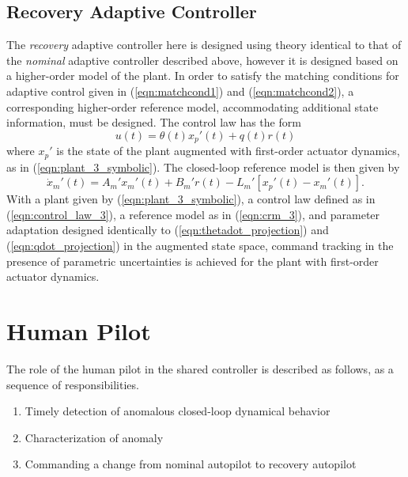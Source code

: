\subsection{Recovery Adaptive Controller} \label{subsec:siso_recovery_ac}
The \textit{recovery} adaptive controller here is designed using theory identical to that of the \textit{nominal} adaptive controller described above, however it is designed based on a higher-order model of the plant. In order to satisfy the matching conditions for adaptive control given in (\ref{eqn:matchcond1}) and (\ref{eqn:matchcond2}), a corresponding higher-order reference model, accommodating additional state information, must be designed. The control law has the form
\begin{equation}
	u(t) = \theta(t) x_p'(t) + q(t) r(t)
	\label{eqn:control_law_3}
\end{equation}
where $x_p'$ is the state of the plant augmented with first-order actuator dynamics, as in (\ref{eqn:plant_3_symbolic}). The closed-loop reference model is then given by
\begin{equation}
	\dot{x}_m'(t) = A_m' x_m'(t) + B_m' r(t) - L_m' \left[x_p'(t) - x_m'(t)\right].
	\label{eqn:crm_3}
\end{equation}
With a plant given by (\ref{eqn:plant_3_symbolic}), a control law defined as in (\ref{eqn:control_law_3}), a reference model as in (\ref{eqn:crm_3}), and parameter adaptation designed identically to (\ref{eqn:thetadot_projection}) and (\ref{eqn:qdot_projection}) in the augmented state space, command tracking in the presence of parametric uncertainties is achieved for the plant with first-order actuator dynamics. 

\section{Human Pilot} \label{sec:siso_sc_human}
The role of the human pilot in the shared controller is described as follows, as a sequence of responsibilities.
\begin{enumerate}[label=Task \arabic*., leftmargin=1.8cm]
	\item Timely detection of anomalous closed-loop dynamical behavior
	\item Characterization of anomaly
	\item Commanding a change from nominal autopilot to recovery autopilot
\end{enumerate}

